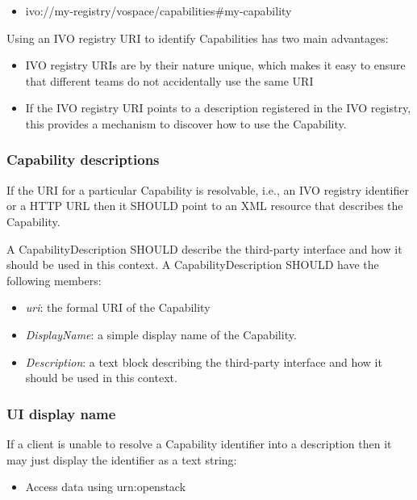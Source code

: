 \documentclass[11pt,a4paper]{ivoa}
\begin{document}
\begin{itemize}
    \item ivo://my-registry/vospace/capabilities\#my-capability
\end{itemize}

Using an IVO registry URI to identify Capabilities has two main advantages:

\begin{itemize}
    \item IVO registry URIs are by their nature unique, which makes it easy to ensure that different teams do not accidentally use the same URI
    \item If the IVO registry URI points to a description registered in the IVO registry, this provides a mechanism to discover how to use the Capability.
\end{itemize}

\subsubsection{Capability descriptions}
\label{subsubsec:capability descriptions}
If the URI for a particular Capability is resolvable, i.e., an IVO registry identifier or a HTTP URL then it SHOULD point to an XML resource that describes the Capability.

A CapabilityDescription SHOULD describe the third-party interface and how it should be used in this context. A CapabilityDescription SHOULD have the following members:

\begin{itemize}
    \item \emph{uri}: the formal URI of the Capability
    \item \emph{DisplayName}: a simple display name of the Capability.
    \item \emph{Description}: a text block describing the third-party interface and how it should be used in this context.
\end{itemize}

\subsubsection{UI display name}
\label{subsubsection:ui display name}
If a client is unable to resolve a Capability identifier into a description then it may just display the identifier as a text string:

\begin{itemize}
    \item Access data using urn:openstack
\end{itemize}
\end{document}
